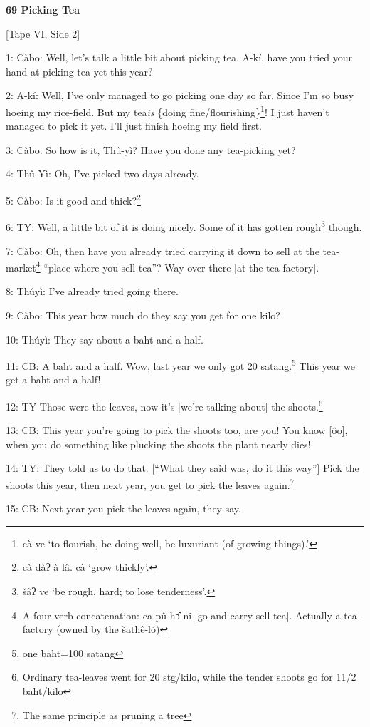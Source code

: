 
\textbf{69 Picking Tea}

[Tape VI, Side 2]

1: Càbo: Well, let's talk a little bit about picking tea.  A-kí, have you tried
your hand at picking tea yet this year?

2: A-kí: Well, I've only managed to go picking one day so far.  Since I'm so busy
hoeing my rice-field.  But my tea\textit{is} \{doing fine/flourishing\}\footnote{cà ve `to flourish, be doing well, be luxuriant (of growing things).'}!  I
just haven't managed to pick it yet.  I'll just finish hoeing my field first.

3: Càbo: So how is it, Thû-yì? Have you done any tea-picking yet?

4: Thû-Yì: Oh, I've picked two days already.

5: Càbo: Is it good and thick?\footnote{cà dàʔ à lâ.  cà `grow thickly'.}

6: TY: Well, a little bit of it is doing nicely.  Some of it has gotten rough\footnote{šâʔ ve `be rough, hard; to lose tenderness'.}
though.

7: Càbo: Oh, then have you already tried carrying it down to sell at the tea-market\footnote{A four-verb concatenation: ca pû hɔ̂ ni [go and carry sell tea].  Actually a tea-factory (owned by the šathê-ló)}
``place where you sell tea''?  Way over there [at the tea-factory].

8: Thúyì: I've already tried going there.

9: Càbo: This year how much do they say you get for one kilo?

10: Thúyì: They say about a baht and a half.

11: CB: A baht and a half.  Wow, last year we only got 20 satang.\footnote{one baht=100 satang}  This year
we get a baht and a half!

12: TY Those were the leaves, now it's [we're talking about] the shoots.\footnote{Ordinary tea-leaves went for 20 stg/kilo, while the tender shoots go for 11/2 baht/kilo}

13: CB: This year you're going to pick the shoots too, are you!  You know [ôo],
when you do something like plucking the shoots the plant nearly dies!

14: TY: They told us to do that.  [``What they said was, do it this way'']  Pick
the shoots this year, then next year, you get to pick the leaves again.\footnote{The same principle as pruning a tree}

15: CB: Next year you pick the leaves again, they say.

